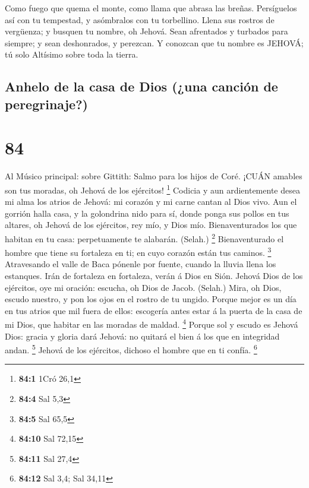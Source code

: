  Como fuego que quema el monte, como llama que abrasa las
breñas.  Persíguelos así con tu tempestad, y asómbralos con
tu torbellino.  Llena sus rostros de vergüenza; y busquen
tu nombre, oh Jehová.  Sean afrentados y turbados para
siempre; y sean deshonrados, y perezcan.  Y conozcan que tu
nombre es JEHOVÁ; tú solo Altísimo sobre toda la tierra.

\hypertarget{anhelo-de-la-casa-de-dios-una-canciuxf3n-de-peregrinaje}{%
\subsection{Anhelo de la casa de Dios (¿una canción de
peregrinaje?)}\label{anhelo-de-la-casa-de-dios-una-canciuxf3n-de-peregrinaje}}

\hypertarget{section-83}{%
\section{84}\label{section-83}}

 Al Músico principal: sobre Gittith: Salmo para los hijos de
Coré. ¡CUÁN amables son tus moradas, oh Jehová de los ejércitos!
\footnote{\textbf{84:1} 1Cró 26,1}  Codicia y aun
ardientemente desea mi alma los atrios de Jehová: mi corazón y mi carne
cantan al Dios vivo.  Aun el gorrión halla casa, y la
golondrina nido para sí, donde ponga sus pollos en tus altares, oh
Jehová de los ejércitos, rey mío, y Dios mío. 
Bienaventurados los que habitan en tu casa: perpetuamente te alabarán.
(Selah.) \footnote{\textbf{84:4} Sal 5,3}  Bienaventurado el
hombre que tiene su fortaleza en ti; en cuyo corazón están tus caminos.
\footnote{\textbf{84:5} Sal 65,5}  Atravesando el valle de
Baca pónenle por fuente, cuando la lluvia llena los estanques.
 Irán de fortaleza en fortaleza, verán á Dios en Sión.
 Jehová Dios de los ejércitos, oye mi oración: escucha, oh
Dios de Jacob. (Selah.)  Mira, oh Dios, escudo nuestro, y
pon los ojos en el rostro de tu ungido.  Porque mejor es un
día en tus atrios que mil fuera de ellos: escogería antes estar á la
puerta de la casa de mi Dios, que habitar en las moradas de maldad.
\footnote{\textbf{84:10} Sal 72,15}  Porque sol y escudo es
Jehová Dios: gracia y gloria dará Jehová: no quitará el bien á los que
en integridad andan. \footnote{\textbf{84:11} Sal 27,4} 
Jehová de los ejércitos, dichoso el hombre que en ti confía. \footnote{\textbf{84:12}
  Sal 3,4; Sal 34,11}

